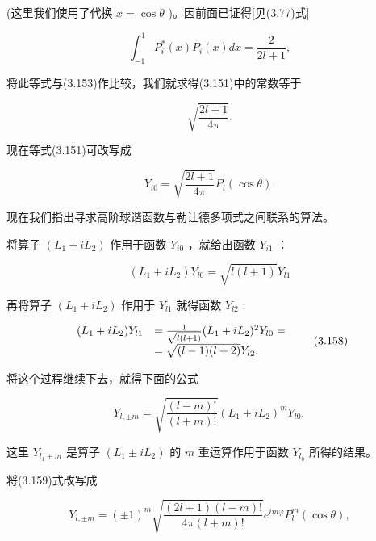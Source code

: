 (这里我们使用了代换 $x = \cos \theta$ )。因前面已证得[见(3.77)式]

\begin{equation*}
\int_ {- 1} ^ {1} P _ {i} ^ {*} (x) P _ {i} (x) d x = \frac {2}{2 l + 1},\tag{3.154}
\end{equation*}

将此等式与(3.153)作比较，我们就求得(3.151)中的常数等于

\begin{equation*}
\sqrt {\frac {2 l + 1}{4 \pi}}.\tag{3.155}
\end{equation*}

现在等式(3.151)可改写成

\begin{equation*}
Y _ {i 0} = \sqrt {\frac {2 l + 1}{4 \pi}} P _ {i} (\cos \theta).\tag{3.156}
\end{equation*}

现在我们指出寻求高阶球谐函数与勒让德多项式之间联系的算法。

将算子 $(L_{1} + iL_{2})$ 作用于函数 $Y_{i0}$ ，就给出函数 $Y_{i1}$ ：

\begin{equation*}
\left(L _ {1} + i L _ {2}\right) Y _ {l 0} = \sqrt {l (l + 1)} Y _ {l 1}\tag{3.157}
\end{equation*}

再将算子 $(L_{1} + iL_{2})$ 作用于 $Y_{l1}$ 就得函数 $Y_{l2}$ :

\begin{equation*}
\begin{array}{r l} (L _ {1} + i L _ {2}) Y _ {l 1} & = \frac {1}{\sqrt {l (l + 1)}} (L _ {1} + i L _ {2}) ^ {2} Y _ {l 0} = \\ & = \sqrt {(l - 1) (l + 2)} Y _ {l 2}. \end{array} \tag{3.158}
\end{equation*}

将这个过程继续下去，就得下面的公式

\begin{equation*}
Y _ {l, \pm m} = \sqrt {\frac {(l - m) !}{(l + m) !}} \left(L _ {1} \pm i L _ {2}\right) ^ {m} Y _ {l 0},\tag{3.159}
\end{equation*}

这里 $Y_{l_1 \pm m}$ 是算子 $(L_1 \pm iL_2)$ 的 $m$ 重运算作用于函数 $Y_{l_0}$ 所得的结果。

将(3.159)式改写成

\begin{equation*}
Y _ {l, \pm m} = (\pm 1) ^ {m} \sqrt {\frac {(2 l + 1) (l - m) !}{4 \pi (l + m) !}} e ^ {i m \varphi} P _ {l} ^ {m} (\cos \theta),\tag{3.160}
\end{equation*}

